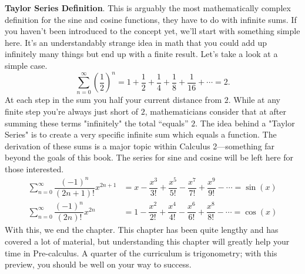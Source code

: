\documentclass[../book.tex]{subfiles}
\begin{document}
\textbf{Taylor Series Definition}.  This is arguably the most mathematically complex definition for the sine and cosine functions, they have to do with infinite sums. If you haven't been introduced to the concept yet, we'll start with something simple here. It's an understandably strange idea in math that you could add up infinitely many things but end up with a finite result. Let's take a look at a simple case. $$\sum_{n=0}^{\infty}{\left(\dfrac{1}{2}\right)^n}=1+\dfrac{1}{2}+\dfrac{1}{4}+\dfrac{1}{8}+\dfrac{1}{16}+\cdots=2.$$
At each step in the sum you half your current distance from $2$. While at any finite step you're always just short of $2$, mathematicians consider that at after summing these terms "infinitely" the total “equals” $2$. The idea behind a "Taylor Series" is to create a very specific infinite sum which equals a function. The derivation of these sums is a major topic within Calculus 2—something far beyond the goals of this book. The series for sine and cosine will be left here for those interested.
\begin{align*}
    \sum_{n=0}^{\infty}{\dfrac{(-1)^n}{(2n+1)!}x^{2n+1}}&=x-\dfrac{x^3}{3!}+\dfrac{x^5}{5!}-\dfrac{x^7}{7!}+\dfrac{x^9}{9!}-\cdots=\sin(x) \\
    \sum_{n=0}^{\infty}{\dfrac{(-1)^n}{(2n)!}x^{2n}}&=1-\dfrac{x^2}{2!}+\dfrac{x^4}{4!}-\dfrac{x^6}{6!}+\dfrac{x^8}{8!}-\cdots=\cos(x)    
\end{align*}
With this, we end the chapter.  This chapter has been quite lengthy and has covered a lot of material, but understanding this chapter will greatly help your time in Pre-calculus.  A quarter of the curriculum is trigonometry; with this preview, you should be well on your way to success.
\end{document}
